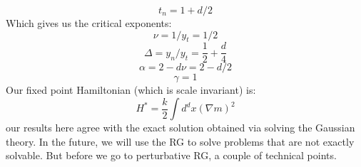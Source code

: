 \begin{equation}
    t_n = 1 + d/2
\end{equation}
Which gives us the critical exponents:
\begin{equation}
    \nu = 1/y_t = 1/2
\end{equation}
\begin{equation}
    \Delta = y_n/y_t = \frac{1}{2} + \frac{d}{4}
\end{equation}
\begin{equation}
    \alpha = 2-d\nu = 2 - d/2
\end{equation}
\begin{equation}
    \gamma = 1
\end{equation}
Our fixed point Hamiltonian (which is scale invariant) is:
\begin{equation}
    H^* = \frac{k}{2}\int d^dx \left(\nabla m \right)^2
\end{equation}
our results here agree with the exact solution obtained via solving the Gaussian theory. In the future, we will use the RG to solve problems that are not exactly solvable. But before we go to perturbative RG, a couple of technical points.


